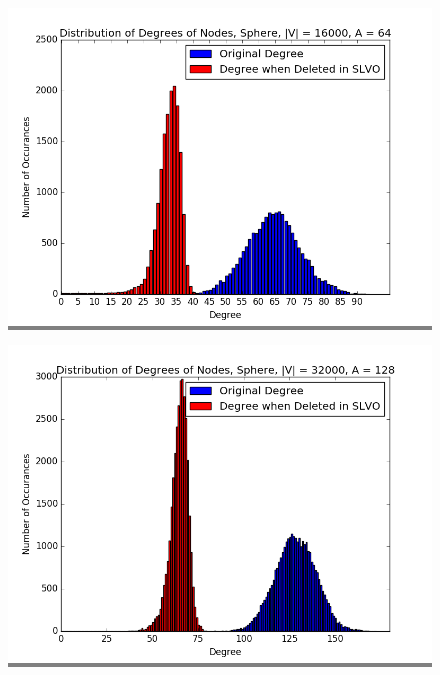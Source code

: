 \documentclass{article}
\begin{document}
\begin{figure}
    \begin{minipage}{0.45\textwidth}
    \colorbox{gray}{\includegraphics[width=\linewidth]{./graphs/hist_deg_del_sphere_0.png}}
    \end{minipage}
    \hspace{\fill}
    \begin{minipage}{0.45\textwidth}
    \colorbox{gray}{\includegraphics[width=\linewidth]{./graphs/hist_deg_del_sphere_1.png}}
    \end{minipage}
    \vskip 0.25in
    \begin{minipage}{0.45\textwidth}

\end{minipage}
\end{figure}
\end{document}
